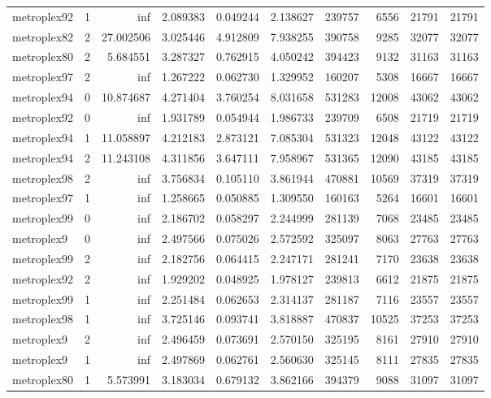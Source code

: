 \begin{longtable}{|l|r|r|r|r|r|r|r|r|r|}
metroplex92 & 1 & inf & 2.089383 & 0.049244 & 2.138627 & 239757 & 6556 & 21791 & 21791 \\
metroplex82 & 2 & 27.002506 & 3.025446 & 4.912809 & 7.938255 & 390758 & 9285 & 32077 & 32077 \\
metroplex80 & 2 & 5.684551 & 3.287327 & 0.762915 & 4.050242 & 394423 & 9132 & 31163 & 31163 \\
metroplex97 & 2 & inf & 1.267222 & 0.062730 & 1.329952 & 160207 & 5308 & 16667 & 16667 \\
metroplex94 & 0 & 10.874687 & 4.271404 & 3.760254 & 8.031658 & 531283 & 12008 & 43062 & 43062 \\
metroplex92 & 0 & inf & 1.931789 & 0.054944 & 1.986733 & 239709 & 6508 & 21719 & 21719 \\
metroplex94 & 1 & 11.058897 & 4.212183 & 2.873121 & 7.085304 & 531323 & 12048 & 43122 & 43122 \\
metroplex94 & 2 & 11.243108 & 4.311856 & 3.647111 & 7.958967 & 531365 & 12090 & 43185 & 43185 \\
metroplex98 & 2 & inf & 3.756834 & 0.105110 & 3.861944 & 470881 & 10569 & 37319 & 37319 \\
metroplex97 & 1 & inf & 1.258665 & 0.050885 & 1.309550 & 160163 & 5264 & 16601 & 16601 \\
metroplex99 & 0 & inf & 2.186702 & 0.058297 & 2.244999 & 281139 & 7068 & 23485 & 23485 \\
metroplex9 & 0 & inf & 2.497566 & 0.075026 & 2.572592 & 325097 & 8063 & 27763 & 27763 \\
metroplex99 & 2 & inf & 2.182756 & 0.064415 & 2.247171 & 281241 & 7170 & 23638 & 23638 \\
metroplex92 & 2 & inf & 1.929202 & 0.048925 & 1.978127 & 239813 & 6612 & 21875 & 21875 \\
metroplex99 & 1 & inf & 2.251484 & 0.062653 & 2.314137 & 281187 & 7116 & 23557 & 23557 \\
metroplex98 & 1 & inf & 3.725146 & 0.093741 & 3.818887 & 470837 & 10525 & 37253 & 37253 \\
metroplex9 & 2 & inf & 2.496459 & 0.073691 & 2.570150 & 325195 & 8161 & 27910 & 27910 \\
metroplex9 & 1 & inf & 2.497869 & 0.062761 & 2.560630 & 325145 & 8111 & 27835 & 27835 \\
metroplex80 & 1 & 5.573991 & 3.183034 & 0.679132 & 3.862166 & 394379 & 9088 & 31097 & 31097 \\
\end{longtable}
